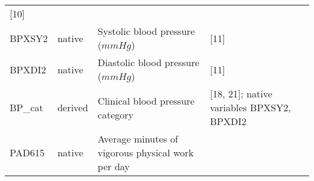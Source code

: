 \documentclass[]{article}
\begin{document}
\begin{longtable}[]{@{}llll@{}}
\begin{minipage}[t]{0.31\columnwidth}
{[}10{]}\strut
\end{minipage}\tabularnewline
\begin{minipage}[t]{0.10\columnwidth}\raggedright
BPXSY2\strut
\end{minipage} & \begin{minipage}[t]{0.05\columnwidth}\raggedright
native\strut
\end{minipage} & \begin{minipage}[t]{0.43\columnwidth}\raggedright
Systolic blood pressure (\(mmHg\))\strut
\end{minipage} & \begin{minipage}[t]{0.31\columnwidth}\raggedright
{[}11{]}\strut
\end{minipage}\tabularnewline
\begin{minipage}[t]{0.10\columnwidth}\raggedright
BPXDI2\strut
\end{minipage} & \begin{minipage}[t]{0.05\columnwidth}\raggedright
native\strut
\end{minipage} & \begin{minipage}[t]{0.43\columnwidth}\raggedright
Diastolic blood pressure (\(mmHg\))\strut
\end{minipage} & \begin{minipage}[t]{0.31\columnwidth}\raggedright
{[}11{]}\strut
\end{minipage}\tabularnewline
\begin{minipage}[t]{0.10\columnwidth}\raggedright
BP\_cat\strut
\end{minipage} & \begin{minipage}[t]{0.05\columnwidth}\raggedright
derived\strut
\end{minipage} & \begin{minipage}[t]{0.43\columnwidth}\raggedright
Clinical blood pressure category\strut
\end{minipage} & \begin{minipage}[t]{0.31\columnwidth}\raggedright
{[}18, 21{]}; native variables BPXSY2, BPXDI2\strut
\end{minipage}\tabularnewline
\begin{minipage}[t]{0.10\columnwidth}\raggedright
PAD615\strut
\end{minipage} & \begin{minipage}[t]{0.05\columnwidth}\raggedright
native\strut
\end{minipage} & \begin{minipage}[t]{0.43\columnwidth}\raggedright
Average minutes of vigorous physical work per day\strut

\end{minipage}
\end{longtable}
\end{document}

